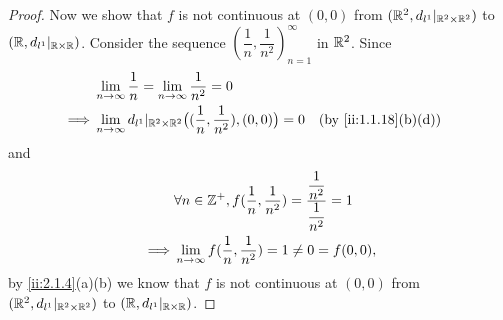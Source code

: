\begin{proof}
  Now we show that \(f\) is not continuous at \((0, 0)\) from \((\mathbb{R}^2, d_{l^1}|_{\mathbb{R}^2 \times \mathbb{R}^2})\) to \((\mathbb{R}, d_{l^1}|_{\mathbb{R} \times \mathbb{R}})\).
  Consider the sequence \((\dfrac{1}{n}, \dfrac{1}{n^2})_{n = 1}^\infty\) in \(\mathbb{R}^2\).
  Since
  \begin{align*}
             & \lim_{n \to \infty} \dfrac{1}{n} = \lim_{n \to \infty} \dfrac{1}{n^2} = 0                                                 \\
    \implies & \lim_{n \to \infty} d_{l^1}|_{\R^2 \times \R^2}\big((\dfrac{1}{n}, \dfrac{1}{n^2}), (0, 0)\big) = 0 &  & \by{ii:1.1.18}[b,d]
  \end{align*}
  and
  \begin{align*}
             & \forall n \in \mathbb{Z}^+, f(\dfrac{1}{n}, \dfrac{1}{n^2}) = \dfrac{\dfrac{1}{n^2}}{\dfrac{1}{n^2}} = 1 \\
    \implies & \lim_{n \to \infty} f(\dfrac{1}{n}, \dfrac{1}{n^2}) = 1 \neq 0 = f(0, 0),
  \end{align*}
  by \cref{ii:2.1.4}(a)(b) we know that \(f\) is not continuous at \((0, 0)\) from \((\mathbb{R}^2, d_{l^1}|_{\mathbb{R}^2 \times \mathbb{R}^2})\) to \((\mathbb{R}, d_{l^1}|_{\mathbb{R} \times \mathbb{R}})\).
\end{proof}
